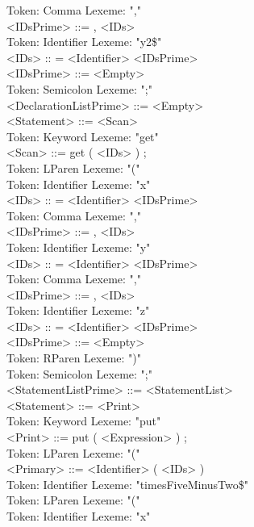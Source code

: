 \documentclass[11pt]{article}
\begin{document}
Token: Comma     Lexeme: "," \\
        <IDsPrime> ::= , <IDs> \\
Token: Identifier        Lexeme: "y2\$" \\
        <IDs> :: = <Identifier> <IDsPrime> \\
        <IDsPrime> ::= <Empty> \\
Token: Semicolon         Lexeme: ";" \\
        <DeclarationListPrime> ::= <Empty> \\
        <Statement> ::= <Scan> \\
Token: Keyword   Lexeme: "get" \\
        <Scan> ::= get ( <IDs> ) ; \\
Token: LParen    Lexeme: "(" \\
Token: Identifier        Lexeme: "x" \\
        <IDs> :: = <Identifier> <IDsPrime> \\
Token: Comma     Lexeme: "," \\
        <IDsPrime> ::= , <IDs> \\
Token: Identifier        Lexeme: "y" \\
        <IDs> :: = <Identifier> <IDsPrime> \\
Token: Comma     Lexeme: "," \\
        <IDsPrime> ::= , <IDs> \\
Token: Identifier        Lexeme: "z" \\
        <IDs> :: = <Identifier> <IDsPrime> \\
        <IDsPrime> ::= <Empty> \\
Token: RParen    Lexeme: ")" \\
Token: Semicolon         Lexeme: ";" \\
        <StatementListPrime> ::= <StatementList> \\
        <Statement> ::= <Print> \\
Token: Keyword   Lexeme: "put" \\
        <Print> ::= put ( <Expression> ) ; \\
Token: LParen    Lexeme: "(" \\
        <Primary> ::= <Identifier> ( <IDs> ) \\
Token: Identifier        Lexeme: "timesFiveMinusTwo\$" \\
Token: LParen    Lexeme: "(" \\
Token: Identifier        Lexeme: "x" \\
\end{document}
